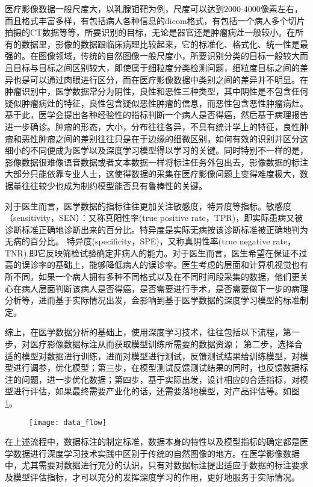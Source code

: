 医疗影像数据一般尺度大，以乳腺钼靶为例，尺度可以达到2000-4000像素左右，而且格式丰富多样，有包括病人各种信息的dicom格式，有包括一个病人多个切片拍摄的CT数据等等，所要识别的目标，无论是器官还是肿瘤病灶一般较小。在所有的数据里，影像的数据跟临床病理比较起来，它的标准化、格式化、统一性是最强的。在图像领域，传统的自然图像一般尺度小，所要识别分类的目标一般较大而且目标与目标之间区别较大，即使属于细粒度分类检测问题，细粒度目标之间的差异也是可以通过肉眼进行区分，而在医疗影像数据中类别之间的差异并不明显。在肿瘤识别中，医学数据常分为阴性，良性和恶性三种类型，其中阴性是不包含任何疑似肿瘤病灶的特征，良性包含疑似恶性肿瘤的信息，而恶性包含恶性肿瘤病灶。基于此，医学会提出各种经验性的指标判断一个病人是否得癌，然后基于病理报告进一步确诊。肿瘤的形态，大小，分布往往各异，不具有统计学上的特征，良性肿瘤和恶性肿瘤之间的差别往往只是在于边缘的细微区别，如何有效的识别并区分这细小的不同便成为医学以及深度学习模型得以学习的关键。同时特别不一样的是，影像数据很难像语音数据或者文本数据一样将标注任务外包出去，影像数据的标注大部分只能依靠专业人士，这使得数据的采集在医疗影像问题上变得难度极大，数据量往往较少也成为制约模型能否具有鲁棒性的关键。

	对于医生而言，医学数据的指标往往更加关注敏感度，特异度等指标。敏感度（sensitivity，SEN）：又称真阳性率(true positive rate，TPR)，即实际患病又被诊断标准正确地诊断出来的百分比。特异度是实际无病按该诊断标准被正确地判为无病的百分比。 特异度(specificity，SPE)，又称真阴性率(true negative rate，TNR),即它反映筛检试验确定非病人的能力。对于医生而言，医生希望在保证不过高的误诊率的基础上，能够降低病人的误诊率。医生考虑的层面和计算机视觉也有所不同，如果一个病人拥有多种不同格式以及在不同时间段采集的数据，他们更关心在病人层面判断该病人是否得癌，是否需要进行手术，是否需要做下一步的病理分析等，进而基于实际情况出发，会影响到基于医学数据的深度学习模型的标准制定。
	
	综上，在医学数据分析的基础上，使用深度学习技术，往往包括以下流程，第一步，对医疗影像数据标注从而获取模型训练所需要的数据资源；
第二步，选择合适的模型对数据进行训练，进而对模型进行测试，反馈测试结果给训练模型，对模型进行调参，优化模型；第三步，在模型测试反馈测试结果的同时，也反馈数据标注的问题，进一步优化数据；第四步，基于实际出发，设计相应的合适指标，对模型进行评估，如果最终需要产业化的话，还需要落地模型，对产品评估等。如图\ref{fig:data_flow}。

	\begin{figure}[!htbp]
    \centering
    \texttt{[image: data\_flow]}
    \label{fig:data_flow}
	\end{figure}
在上述流程中，数据标注的制定标准，数据本身的特性以及模型指标的确定都是医学数据进行深度学习技术实践中区别于传统的自然图像的地方。在医学影像数据中，尤其需要对数据进行充分的认识，只有对数据标注提出适应于数据的标注要求及模型评估指标，才可以充分的发挥深度学习的作用，更好地服务于实际情况。

